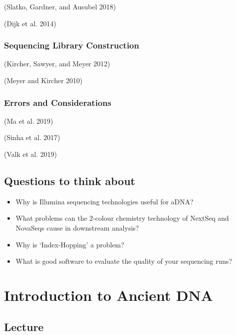 \documentclass[
  letterpaper,
]{book}
\providecommand{\tightlist}{%
  \setlength{\itemsep}{0pt}\setlength{\parskip}{0pt}}\usepackage{longtable,booktabs,array}
\begin{document}
(Slatko, Gardner, and Ausubel 2018)

(Dijk et al. 2014)

\hypertarget{sequencing-library-construction}{%
\subsection{Sequencing Library
Construction}\label{sequencing-library-construction}}

(Kircher, Sawyer, and Meyer 2012)

(Meyer and Kircher 2010)

\hypertarget{errors-and-considerations}{%
\subsection{Errors and Considerations}\label{errors-and-considerations}}

(Ma et al. 2019)

(Sinha et al. 2017)

(Valk et al. 2019)

\hypertarget{questions-to-think-about}{%
\section{Questions to think about}\label{questions-to-think-about}}

\begin{itemize}
\tightlist
\item
  Why is Illumina sequencing technologies useful for aDNA?
\item
  What problems can the 2-colour chemistry technology of NextSeq and
  NovaSeqs cause in downstream analysis?
\item
  Why is `Index-Hopping' a problem?
\item
  What is good software to evaluate the quality of your sequencing runs?
\end{itemize}

\hypertarget{introduction-to-ancient-dna-1}{%
\chapter{Introduction to Ancient
DNA}\label{introduction-to-ancient-dna-1}}

\hypertarget{lecture-1}{%
\section{Lecture}\label{lecture-1}}
\end{document}
